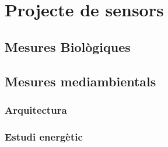 \chapter{Projecte de sensors}
\section{Mesures Biològiques}
\section{Mesures mediambientals}
\subsection{Arquitectura}
\subsection{Estudi energètic}